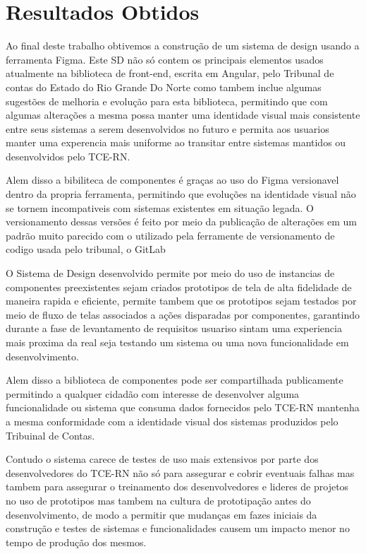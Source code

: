 \chapter[Capítulo 4]{Resultados Obtidos}
\label{ch:cap4}

  Ao final deste trabalho obtivemos a construção de um sistema de design usando a ferramenta Figma. Este SD não só contem os principais elementos usados atualmente na biblioteca de front-end, escrita em Angular, pelo Tribunal de contas do Estado do Rio Grande Do Norte como tambem inclue algumas sugestões de melhoria e evolução para esta biblioteca, permitindo que com algumas alterações a mesma possa manter uma identidade visual mais consistente entre seus sistemas a serem desenvolvidos no futuro e permita aos usuarios manter uma experencia mais uniforme ao transitar entre sistemas mantidos ou desenvolvidos pelo TCE-RN.
  
  Alem disso a bibiliteca de componentes é graças ao uso do Figma versionavel dentro da propria ferramenta, permitindo que evoluções na identidade visual não se tornem incompativeis com sistemas existentes em situação legada. O versionamento dessas versões é feito por meio da publicação de alterações em um padrão muito parecido com o utilizado pela ferramente de versionamento de codigo usada pelo tribunal, o GitLab

  O Sistema de Design desenvolvido permite por meio do uso de instancias de componentes preexistentes sejam criados prototipos de tela de alta fidelidade de maneira rapida e eficiente, permite tambem que os prototipos sejam testados por meio de fluxo de telas associados a ações disparadas por componentes, garantindo durante a fase de levantamento de requisitos usuariso sintam uma experiencia mais proxima da real seja testando um sistema ou uma nova funcionalidade em desenvolvimento.

  Alem disso a biblioteca de componentes pode ser compartilhada publicamente permitindo a qualquer cidadão com interesse de desenvolver alguma funcionalidade ou sistema que consuma dados fornecidos pelo TCE-RN mantenha a mesma conformidade com a identidade visual dos sistemas produzidos pelo Tribuinal de Contas.

  Contudo o sistema carece de testes de uso mais extensivos por parte dos desenvolvedores do TCE-RN não só para assegurar e cobrir eventuais falhas mas tambem para assegurar o treinamento dos desenvolvedores e lideres de projetos no uso de prototipos mas tambem na cultura de prototipação antes do desenvolvimento, de modo a permitir que mudanças em fazes iniciais da construção e testes de sistemas e funcionalidades causem um impacto menor no tempo de produção dos mesmos.

